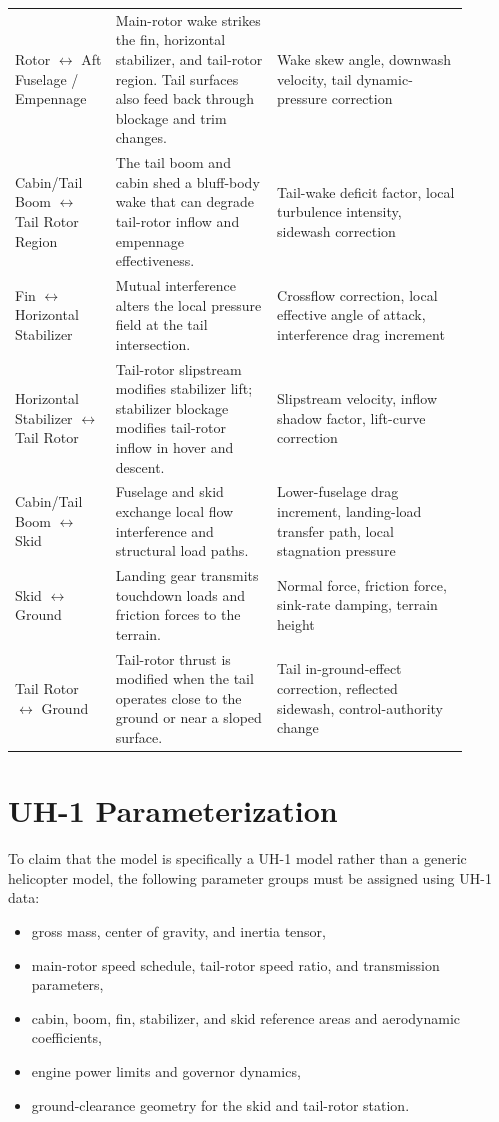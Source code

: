 \documentclass[12pt,a4paper]{article}
\begin{document}
\begin{longtable}{p{0.20\linewidth} p{0.32\linewidth} p{0.38\linewidth}}
Rotor $\leftrightarrow$ Aft Fuselage / Empennage & Main-rotor wake strikes the fin, horizontal stabilizer, and tail-rotor region. Tail surfaces also feed back through blockage and trim changes. & Wake skew angle, downwash velocity, tail dynamic-pressure correction \\
Cabin/Tail Boom $\leftrightarrow$ Tail Rotor Region & The tail boom and cabin shed a bluff-body wake that can degrade tail-rotor inflow and empennage effectiveness. & Tail-wake deficit factor, local turbulence intensity, sidewash correction \\
Fin $\leftrightarrow$ Horizontal Stabilizer & Mutual interference alters the local pressure field at the tail intersection. & Crossflow correction, local effective angle of attack, interference drag increment \\
Horizontal Stabilizer $\leftrightarrow$ Tail Rotor & Tail-rotor slipstream modifies stabilizer lift; stabilizer blockage modifies tail-rotor inflow in hover and descent. & Slipstream velocity, inflow shadow factor, lift-curve correction \\
Cabin/Tail Boom $\leftrightarrow$ Skid & Fuselage and skid exchange local flow interference and structural load paths. & Lower-fuselage drag increment, landing-load transfer path, local stagnation pressure \\
Skid $\leftrightarrow$ Ground & Landing gear transmits touchdown loads and friction forces to the terrain. & Normal force, friction force, sink-rate damping, terrain height \\
Tail Rotor $\leftrightarrow$ Ground & Tail-rotor thrust is modified when the tail operates close to the ground or near a sloped surface. & Tail in-ground-effect correction, reflected sidewash, control-authority change \\
\bottomrule
\end{longtable}

\section{UH-1 Parameterization}

To claim that the model is specifically a UH-1 model rather than a generic helicopter model, the following parameter groups must be assigned using UH-1 data:
\begin{itemize}
  \item gross mass, center of gravity, and inertia tensor,
  \item main-rotor speed schedule, tail-rotor speed ratio, and transmission parameters,
  \item cabin, boom, fin, stabilizer, and skid reference areas and aerodynamic coefficients,
  \item engine power limits and governor dynamics,
  \item ground-clearance geometry for the skid and tail-rotor station.
\end{itemize}
\end{document}
